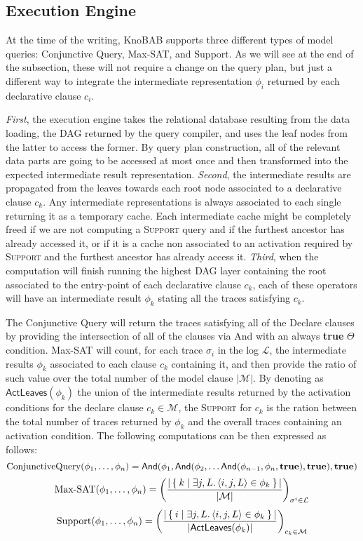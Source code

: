 
\subsection{Execution Engine} \label{ssec:xltlf}
At the time of the writing, KnoBAB supports three different types of model queries: Conjunctive Query, Max-SAT, and Support. As we will see at the end of the subsection, these will not require a change on the query plan, but just a different way to integrate the intermediate representation $\phi_i$ returned by each declarative clause $c_i$. 

\textit{First}, the execution engine takes the relational database resulting from the data loading, the DAG returned by the query compiler, and uses the leaf nodes from the latter to access the former. By query plan construction, all of the relevant data parts are going to be accessed at most once and then transformed into the expected intermediate result representation. \textit{Second}, the intermediate results are propagated from the leaves towards each root node associated to a declarative clause $c_k$. Any intermediate representations is always associated to each single returning it as a temporary cache. Each intermediate cache  might be completely freed if we are not computing a  \textsc{Support} query and if the furthest ancestor has already accessed it, or if it is a cache non associated to an activation required by \textsc{Support} and the furthest ancestor has already access it. \textit{Third}, when the computation will finish running the highest DAG layer containing the \xLTLf root associated to the entry-point of each declarative clause $c_k$, each of these operators will have an intermediate result $\phi_k$ stating all the traces satisfying $c_k$.

The {Conjunctive Query} will return the traces satisfying all of the Declare clauses by providing the intersection of all of the clauses via \textsf{And} with an always \textbf{true} $\Theta$ condition. Max-SAT will count, for each trace $\sigma_i$ in the log $\mathcal{L}$, the intermediate results $\phi_k$ associated to each clause $c_k$ containing it, and then provide the ratio of such value over the total number of the model clause $|\mathcal{M}|$. By denoting as $\textsf{ActLeaves}(\phi_k)$ the union of the intermediate results returned by the activation conditions for the declare clause $c_k\in\mathcal{M}$, the \textsc{Support} for $c_k$ is the ration between the total number of traces returned by $\phi_k$ and the overall traces containing an activation condition. The following computations can be then expressed as follows:
\[\textup{ConjunctiveQuery}(\phi_1,\dots,\phi_n)=\textsf{And}(\phi_1,\textsf{And}(\phi_2,\dots\textsf{And}(\phi_{n-1},\phi_n,\textbf{true}),\textbf{true}),\textbf{true})\]
\[\textup{Max-SAT}(\phi_1,\dots,\phi_n)=\left(\frac{|\Set{k|\exists j,L. \braket{i,j,L}\in\phi_k}|}{|\mathcal{M}|}\right)_{\sigma^i\in \mathcal{L}}\]
\[\textup{Support}(\phi_1,\dots,\phi_n)=\left(\frac{|\Set{i|\exists j,L. \braket{i,j,L}\in \phi_k}|}{|\textsf{ActLeaves}(\phi_k)|}\right)_{c_k\in \mathcal{M}}\]



